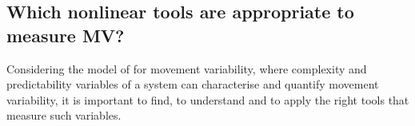 \subsection{Which nonlinear tools are appropriate to measure MV?} 
\label{which_NT_are_appropriate_to_measure_MV}


Considering the model of \cite{stergiou2006} for movement variability,
where complexity and predictability variables of a system can 
characterise and quantify movement variability, it is important to 
find, to understand and to apply the right tools that measure such variables.



